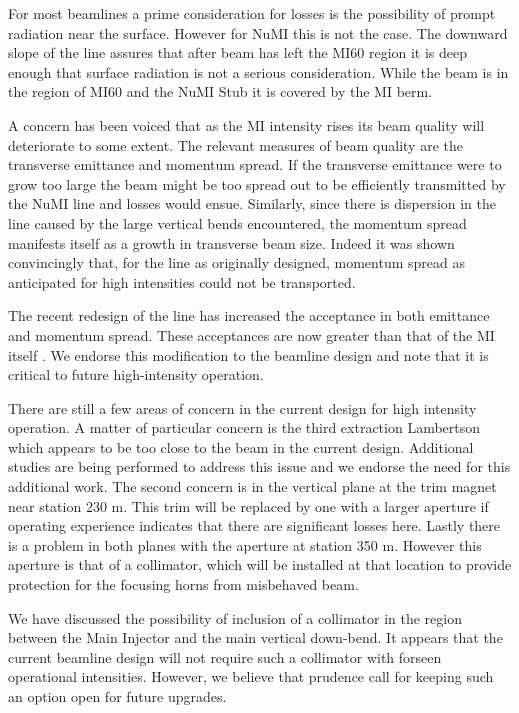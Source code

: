 \documentclass{article}
\begin{document}
For most beamlines a prime consideration for losses is the possibility of 
prompt radiation near the surface. However for NuMI this is not the case. The 
downward slope of the line assures that after beam has left the MI60 region it 
is deep enough that surface radiation is not a serious consideration. While 
the beam is in the region of MI60 and the NuMI Stub it is covered by the MI 
berm.

A concern has been voiced that as the MI intensity rises its beam quality will 
deteriorate to some extent. The relevant measures of beam quality 
are the transverse emittance and momentum spread. If the transverse 
emittance were to grow too large the beam might be too spread out to be 
efficiently 
transmitted by the NuMI line and losses would ensue. Similarly, since there is 
dispersion in the line caused by the large vertical bends encountered, the 
momentum spread manifests itself as a growth in transverse beam size. Indeed 
it was shown convincingly that, for the line as originally designed, momentum 
spread as anticipated for high intensities could not be transported. 

The recent redesign of the line has increased the acceptance in both emittance 
and momentum spread. These acceptances are now greater than that of the MI 
itself \cite {numiprimarybeam}. We endorse this modification to the beamline
design and note that it is critical to future high-intensity operation.

There are still a few areas of concern in the current design for high
intensity operation. A matter of particular concern is the third 
extraction Lambertson which appears to be too close to the beam in the 
current design. Additional studies are being performed to address this issue
and we endorse the need for this additional work. The second concern is in 
the vertical plane at the trim magnet near station 230 m. This trim will be 
replaced by one with a larger aperture if operating experience indicates that 
there are significant losses here. Lastly there is a problem in both planes 
with the aperture at station 350 m. However this aperture is that of a 
collimator, which will be installed at that location to provide protection 
for the focusing horns from misbehaved beam. 

We have discussed the possibility of inclusion of a collimator in the
region between the Main Injector and the main vertical down-bend. It appears
that the current beamline design will not require such a collimator with
forseen operational intensities. However, we believe that prudence call for
keeping such an option open for future upgrades.
\end{document}
